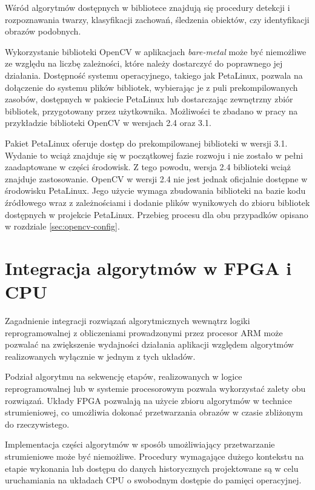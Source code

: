 Wśród algorytmów dostępnych w bibliotece znajdują się procedury detekcji i rozpoznawania twarzy, klasyfikacji zachowań, śledzenia obiektów, czy identyfikacji obrazów podobnych. %

Wykorzystanie biblioteki OpenCV w aplikacjach \textit{bare-metal} może być niemożliwe ze względu na liczbę zależności, które należy dostarczyć do poprawnego jej działania. 
Dostępność systemu operacyjnego, takiego jak PetaLinux, pozwala na dołączenie do systemu plików bibliotek, wybierając je z puli prekompilowanych zasobów, dostępnych w pakiecie PetaLinux lub dostarczając zewnętrzny zbiór bibliotek, przygotowany przez użytkownika. 
Możliwości te zbadano w pracy na przykładzie biblioteki OpenCV w wersjach 2.4 oraz 3.1.

Pakiet PetaLinux oferuje dostęp do prekompilowanej biblioteki w wersji 3.1. 
Wydanie to wciąż znajduje się w początkowej fazie rozwoju i nie zostało w pełni zaadaptowane w części środowisk. 
Z tego powodu, wersja 2.4 biblioteki wciąż znajduje zastosowanie.
OpenCV w wersji 2.4 nie jest jednak oficjalnie dostępne w środowisku PetaLinux. 
Jego użycie wymaga zbudowania biblioteki na bazie kodu źródłowego wraz z zależnościami i dodanie plików wynikowych do zbioru bibliotek dostępnych w projekcie PetaLinux.
Przebieg procesu dla obu przypadków opisano w rozdziale \ref{sec:opencv-config}.

\section{Integracja algorytmów w FPGA i CPU}

Zagadnienie integracji rozwiązań algorytmicznych wewnątrz logiki reprogramowalnej z obliczeniami prowadzonymi przez procesor ARM może pozwalać na zwiększenie wydajności działania aplikacji względem algorytmów realizowanych wyłącznie w jednym z tych układów.

Podział algorytmu na sekwencję etapów, realizowanych w logice reprogramowalnej lub w systemie procesorowym pozwala wykorzystać zalety obu rozwiązań. 
Układy FPGA pozwalają na użycie zbioru algorytmów w technice strumieniowej, co umożliwia dokonać przetwarzania obrazów w czasie zbliżonym do rzeczywistego. %

Implementacja części algorytmów w sposób umożliwiający przetwarzanie strumieniowe może być niemożliwe. %
Procedury wymagające dużego kontekstu na etapie wykonania lub dostępu do danych historycznych projektowane są w celu uruchamiania na układach CPU o swobodnym dostępie do pamięci operacyjnej. %

